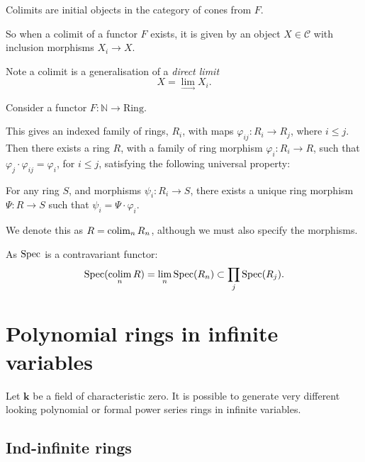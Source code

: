     Colimits are initial objects in the category of cones from \(F\). 
    
    So when a colimit of a functor \(F\) exists, it is given by an object \(X \in \mathcal{C}\) with inclusion morphisms \(X_i \rightarrow X\).  
    \begin{rem} Note a colimit is a generalisation of a \emph{direct limit} \[X = \lim_{\longrightarrow} X_i.\]
    \end{rem}
    

    \begin{lem}
    Consider a functor \(F : \mathbb{N} \rightarrow \mathrm{Ring}\).
    
    This gives an indexed family of rings, \(R_i\), with maps \( \varphi_{ij} : R_i \rightarrow R_j\), where \(i \leq j \). Then there exists a ring \(R\), with a family of ring morphism \( \varphi_i : R_i \rightarrow R\), such that \( \varphi_j \cdot \varphi_{ij} = \varphi_i\), for \( i \leq j\), satisfying the following universal property:
    
    For any ring \(S\), and morphisms \( \psi_i :  R_i \rightarrow S\), there exists a unique ring morphism \(\Psi : R \rightarrow S \) such that \( \psi_i = \Psi \cdot \varphi_i \). 
    \end{lem}
    \begin{rem}
    We denote this as \(R= \operatorname*{colim}_n R_n\), although we must also specify the morphisms.
    \end{rem}

    \begin{lem} As \( \mathrm{Spec}\) is a contravariant functor:
    \[ \mathrm{Spec}(\operatorname*{colim}_n R) = \lim_n \mathrm{Spec}(R_n) \subset \prod_j  \mathrm{Spec}(R_j).\]
    \end{lem} 
    
    \section{Polynomial rings in infinite variables}
    
    Let \( \mathbf{k} \) be a field of characteristic zero. 
    It is possible to generate very different looking polynomial or formal power series rings in infinite variables.
    
    \subsection{Ind-infinite rings}
    
